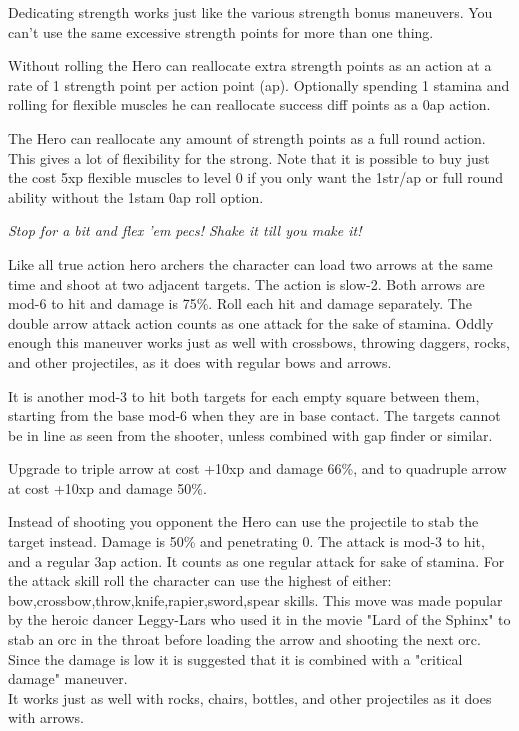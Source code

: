 Dedicating strength works just like the various strength bonus maneuvers. You can't use the same excessive strength points for more than one thing.


Without rolling the Hero can reallocate extra strength points as an action at a rate of 1 strength point per action point (ap). Optionally spending 1 stamina and rolling for flexible muscles he can reallocate success diff points as a 0ap action.

The Hero can reallocate any amount of strength points as a full round action.
This gives a lot of flexibility for the strong. Note that it is possible to buy just the cost 5xp flexible muscles to level 0 if you only want the 1str/ap or full round ability without the 1stam 0ap roll option.

\noindent \textit{Stop for a bit and flex 'em pecs! Shake it till you make it!}


 Like all true action hero archers the character can load two arrows at the same time and shoot at two adjacent targets. The action is slow-2. Both arrows are mod-6 to hit and damage is 75\%. Roll each hit and damage separately. The double arrow attack action counts as one attack for the sake of stamina. 
Oddly enough this maneuver works just as well with crossbows, throwing daggers, rocks, and other projectiles, as it does with regular bows and arrows.

It is another mod-3 to hit both targets for each empty square between them, starting from the base mod-6 when they are in base contact. The targets cannot be in line as seen from the shooter, unless combined with gap finder or similar.

Upgrade to triple arrow at cost +10xp and damage 66\%, and to quadruple arrow at cost +10xp and damage 50\%.


 Instead of shooting you opponent the Hero can use the projectile to stab the target instead. Damage is 50\% and penetrating 0. The attack is mod-3 to hit, and a regular 3ap action. It counts as one regular attack for sake of stamina. For the attack skill roll the character can use the highest of either: bow,crossbow,throw,knife,rapier,sword,spear skills.
This move was made popular by the heroic dancer Leggy-Lars who used it in the movie "Lard of the Sphinx" to stab an orc in the throat before loading the arrow and shooting the next orc. Since the damage is low it is suggested that it is combined with a "critical damage" maneuver. \\
It works just as well with rocks, chairs, bottles, and other projectiles as it does with arrows.


